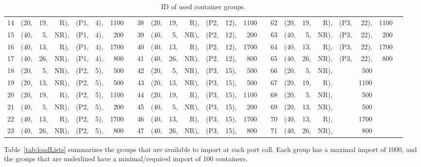 \begin{table}
\begin{center}
\begin{scriptsize}
\begin{tabular}{*{3}{@{\hskip15pt}r|*{5}{r@{\hskip3pt}}rc}}
  14&(20,&19,& R),&(P1,& 4),&1100&  &       38&(20,&19,& R),&(P2,&12),&1100&  &     62&(20,&19,& R),&(P3,&22),&1100\\
  15&(40,& 5,&NR),&(P1,& 4),& 200&  &       39&(40,& 5,&NR),&(P2,&12),& 200&  &     63&(40,& 5,&NR),&(P3,&22),& 200\\
  16&(40,&13,& R),&(P1,& 4),&1700&  &       40&(40,&13,& R),&(P2,&12),&1700&  &     64&(40,&13,& R),&(P3,&22),&1700\\
  17&(40,&26,&NR),&(P1,& 4),& 800&  &       41&(40,&26,&NR),&(P2,&12),& 800&  &     65&(40,&26,&NR),&(P3,&22),& 800\\
  18&(20,& 5,&NR),&(P2,& 5),& 500&  &       42&(20,& 5,&NR),&(P3,&15),& 500&  &     66&(20,& 5,&NR),&& 500\\
  19&(20,&13,&NR),&(P2,& 5),& 500&  &       43&(20,&13,&NR),&(P3,&15),& 500&  &     67&(20,&19,& R),&&1100\\
  20&(20,&19,& R),&(P2,& 5),&1100&  &       44&(20,&19,& R),&(P3,&15),&1100&  &     68&(20,& 5,&NR),&& 500\\
  21&(40,& 5,&NR),&(P2,& 5),& 200&  &       45&(40,& 5,&NR),&(P3,&15),& 200&  &     69&(20,&13,&NR),&& 500\\
  22&(40,&13,& R),&(P2,& 5),&1700&  &       46&(40,&13,& R),&(P3,&15),&1700&  &     70&(40,&13,& R),&&1700\\
  23&(40,&26,&NR),&(P2,& 5),& 800&  &       47&(40,&26,&NR),&(P3,&15),& 800&  &     71&(40,&26,&NR),&& 800\\
\end{tabular}
\caption{ID of used container groups.}\label{tab:groupIDs}
\end{scriptsize}
\end{center}
\end{table}

Table~\ref{tab:loadLists} summarizes the groups that are available to import at each port call. Each group has a maximal import of 1000, and the groups that are underlined have a minimal/required import of 100 containers.
  
